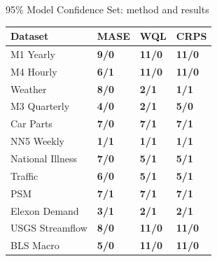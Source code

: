 \documentclass[aspectratio=169,10pt]{beamer}
\begin{document}
\begin{frame}[t]{95\% Model Confidence Set: method and results}
  \vspace{0cm}
  \begin{center}
    \fontsize{7.2}{7.8}\selectfont
    \renewcommand{\arraystretch}{0.85}
    \setlength{\tabcolsep}{6.2pt}
    \begin{tabular}{L{3.45cm} C{2.58cm} C{2.58cm} C{2.58cm}}
      \toprule
      \textbf{Dataset} & \textbf{MASE} & \textbf{WQL} & \textbf{CRPS} \\
      \midrule
      M1 Yearly & \textbf{9/0} & \textbf{11/0} & \textbf{11/0} \\
       M4 Hourly & \textbf{6/1} & \textbf{11/0} & \textbf{11/0} \\
      Weather & \textbf{8/0} & \textbf{2/1} & \textbf{1/1} \\
       M3 Quarterly & \textbf{4/0} & \textbf{2/1} & \textbf{5/0} \\
      Car Parts & \textbf{7/0} & \textbf{7/1} & \textbf{7/1} \\
       NN5 Weekly & \textbf{1/1} & \textbf{1/1} & \textbf{1/1} \\
      National Illness & \textbf{7/0} & \textbf{5/1} & \textbf{5/1} \\
       Traffic & \textbf{6/0} & \textbf{5/1} & \textbf{5/1} \\
      PSM & \textbf{7/1} & \textbf{7/1} & \textbf{7/1} \\
       Elexon Demand & \textbf{3/1} & \textbf{2/1} & \textbf{2/1} \\
      USGS Streamflow & \textbf{8/0} & \textbf{11/0} & \textbf{11/0} \\
       BLS Macro & \textbf{5/0} & \textbf{11/0} & \textbf{11/0} \\
      \bottomrule
    \end{tabular}
  \end{center}


\end{frame}
\end{document}
